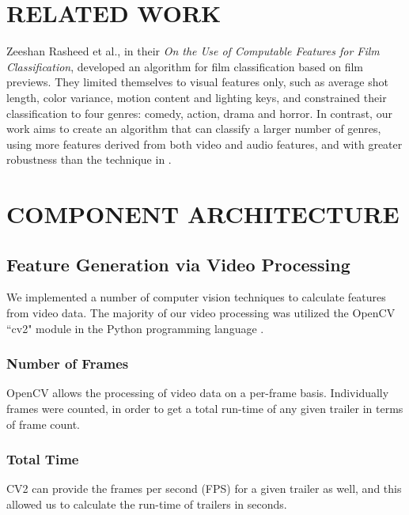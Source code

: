 \documentclass[letterpaper, 10 pt, conference]{ieeeconf}  %
\begin{document}
\section{RELATED WORK}
Zeeshan Rasheed et al., in their \textit{On the Use of Computable Features for Film Classification}\cite{Rasheed}, developed an algorithm for film classification based on film previews. They limited themselves to visual features only, such as average shot length, color variance, motion content and lighting keys, and constrained their classification to four genres: comedy, action, drama and horror. In contrast, our work aims to create an algorithm that can classify a larger number of genres, using more features derived from both video and audio features, and with greater robustness than the technique in \cite{Rasheed}.

\section{COMPONENT ARCHITECTURE}

\subsection{Feature Generation via Video Processing}

We implemented a number of computer vision techniques to calculate features from video data. The majority of our video processing was utilized the OpenCV ``cv2" module in the Python programming language \cite{cv2}.

\subsubsection{Number of Frames}

OpenCV allows the processing of video data on a per-frame basis. Individually frames were counted, in order to get a total run-time of any given trailer in terms of frame count.

\subsubsection{Total Time}
CV2 can provide the frames per second (FPS) for a given trailer as well, and this allowed us to calculate the run-time of trailers in seconds.
\end{document}
